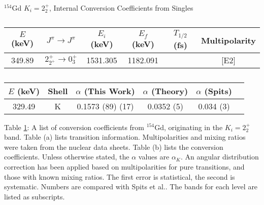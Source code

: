 \begin{table}
    \centering
    \caption{$^{154}$Gd $K_i=2^+_2$, Internal Conversion Coefficients from Singles}
    \label{tab:154Gd_Single_22_Disc}
\begin{ThreePartTable}
    \begin{subtable}{\textwidth}
        \caption{}
    \begin{tabular}{c|c|c|c|c|c}
        \toprule
        $E$ (keV)	&	$J^{\pi}	\rightarrow	J^{\pi}$	&	$E_i$ (keV)	&	$E_f$ (keV)	&	$T_{1/2}$ (fs)	&	Multipolarity	\\
        \hline
        349.89	&	$2^+_{2^+}	\rightarrow	0^+_{3}$	&	1531.305	&	1182.091	&		&	[E2]	\\
        \bottomrule
    \end{tabular}
    \end{subtable}
    \end{ThreePartTable}
\end{table}
\begin{table}
    \ContinuedFloat
    \begin{subtable}{\textwidth}
    \end{subtable}
    \begin{ThreePartTable}
    \begin{subtable}{\textwidth}
        \caption{}
        \begin{tabular}{c|c|c|c|c|c}
            \toprule
            $E$ (keV) & Shell &	$\alpha$ (This Work)	&	$\alpha$  (Theory)\citep{kibedi08:_BRICC}	&	$\alpha$ (Spits)\citep{spits96:_154gd}	\\
            \hline
            329.49	 & K &	0.1573	(89) (17)	&	0.0352 (5)	&	0.034 (3)	\\
            \bottomrule
        \end{tabular}
        \end{subtable}

        \makeatletter\def\TPT@hsize{}\makeatletter

        \begin{tablenotes}[para]
            Table \ref{tab:154Gd_Single_22_Disc}: A list of conversion coefficients from $^{154}$Gd, originating in the $K_i=2^+_2$ band. Table (a) lists transition information. Multipolarities and mixing ratios were taken from the nuclear data sheets\citep{reich09:_nds_154}. Table (b) lists the conversion coefficients. Unless otherwise stated, the $\alpha$ values are $\alpha_K$. An angular distribution correction has been applied based on multipolarities for pure transitions, and those with known mixing ratios. The first error is statistical, the second is systematic. Numbers are compared with Spits et al.\citep{spits96:_154gd}. The bands for each level are listed as subscripts.
        \end{tablenotes}
\end{ThreePartTable}
\end{table}
